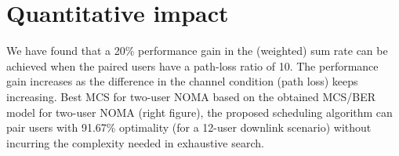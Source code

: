 \section{Quantitative impact}
\label{sec_impact}
We have found that a 20\% performance gain in the (weighted) sum
rate can be achieved when the paired users have a path-loss ratio
of 10. The performance gain increases as the difference in the
channel condition (path loss) keeps increasing.
Best MCS for two-user NOMA based on the obtained MCS/BER model 
for two-user NOMA (right figure), the proposed scheduling algorithm 
can pair users with 91.67\% optimality (for a 12-user downlink scenario)
without incurring the complexity needed in exhaustive search.

